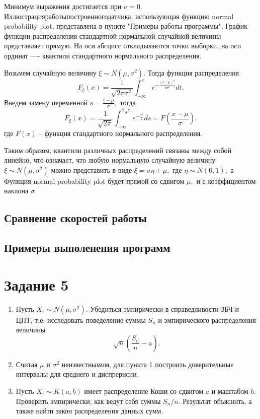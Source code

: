 \documentclass[11pt]{article}
\numberwithin{equation}{section}
\begin{document}
Минимум выражения достигается при $a = 0$.
Иллюстрацияработыпостроенногодатчика, использующая функцию \textsf{normal probability plot},
представлена в пункте "Примеры работы программы".
График функции распределения стандартной нормальной случайной величины представляет прямую.
На оси абсцисс откладываются точки выборки, на оси ординат —- квантили стандартного нормального распределения.

Возьмем случайную величину $\xi \sim N(\mu, \sigma^2).$ Тогда функция распределения 
$$ F_{\xi}(x) = \frac{1}{\sqrt{2\pi\sigma^2}} \int_{-\infty}^{x} e^{-\frac{(t-\mu)^2}{2\sigma^2}}dt.$$
Введем замену переменной $s= \frac{t-\mu}{\sigma},$ тогда
$$ F_{\xi}(x) = \frac{1}{\sqrt{2\pi}} \int_{-\infty}^{\frac{x-\mu}{\sigma}} e^{-\frac{s^2}{2}}ds = F(\frac{x-\mu}{\sigma}).$$
где $F(x)$ -- функция стандартного нормального распределения.


Таким образом, квантили различных распределений связаны между собой линейно, что означает, что любую нормальную случайную величину
$\xi \sim N(\mu, \sigma^2)$ можно представить в виде $\xi = \sigma \eta + \mu,$ где $\eta \sim N(0,1),$ а Функция
\textsf{normal probability plot}  будет прямой со сдвигом $\mu,$ и с коэффициентом наклона $\sigma.$
\subsection{Сравнение скоростей работы}

\subsection{Примеры выполенения программ}


\section{Задание 5}
\begin{enumerate}
  \item Пусть $X_i \sim N(\mu, \sigma^2).$ Убедиться эмпирически в справедливости ЗБЧ и ЦПТ, т.е.
  исследовать поведеление суммы $S_n$ и эмпирического распределения величины
  $$ \sqrt{n} (\frac{S_n}{n}-a).$$
  \item Считая $\mu$ и $\sigma^2$ неизвестнымим, для пункта 1 построить доверительные интервалы для среднего и диспрерисии.
  \item Пусть $X_i \sim K(a,b)$ имеет распределение Коши со сдвигом $a$ и маштабом $b$. Проверить эмпирически, как ведут себя суммы $S_n/n.$
  Результат объяснить, а также найти закон распределения данных сумм.
\end{enumerate}
\end{document}
